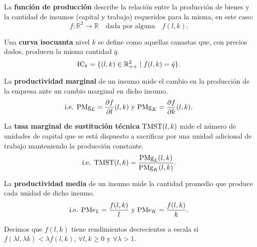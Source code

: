 \documentclass[8pt,a4paper]{extarticle}
\begin{document}
\begin{multicols}{3}
	\begin{boxdef}
		La \textbf{función de producción} describe la relación entre la producción de bienes y la cantidad de insumos (capital y trabajo) requeridos para la misma, en este caso:
		\[
			f: \mathbb{R}^2 \to \mathbb{R} \quad \text{dada por alguna} \quad f(l, k)
			.\]
	\end{boxdef}

	\begin{boxdef}[Isocuanta]
		Una \textbf{curva isocuanta} nivel $k$ se define como aquellas canastas que, con precios dados, producen la misma cantidad $\bar{q}$. \\
		$$\text{\normalfont IC}_k = \{(l, k) \in \mathbb{R}^2_{++} \mid f(l, k) = \bar{q} \}.$$
	\end{boxdef}

	\begin{boxdef}
		La \textbf{productividad marginal} de un insumo mide el cambio en la producción de la empresa ante un cambio marginal en dicho insumo.
		\[
			\text{\normalfont i.e. PMg}_L = \frac{\partial f}{\partial l} (l, k)\ \text{y } \text{\normalfont PMg}_K = \frac{\partial f}{\partial k} (l, k)
			.\]
	\end{boxdef}

	\begin{boxdef}
		La \textbf{tasa marginal de sustitución técnica} $\text{\normalfont TMST} (l, k) $ mide el número de unidades de capital que se está dispuesto a sacrificar por una unidad adicional de trabajo manteniendo la producción constante.
		\[
			\text{\normalfont i.e. TMST}(l,k) = \frac{\text{\normalfont PMg}_L (l, k)}{\text{\normalfont PMg}_K (l, k)}
			.\]
	\end{boxdef}

	\begin{boxdef}
		La \textbf{productividad media} de un insumo mide la cantidad promedio que produce cada unidad de dicho insumo.
		\[
			\text{\normalfont i.e. PMe}_L = \frac{f (l, k)}{l}\ \text{y } \text{\normalfont PMe}_K = \frac{f (l, k)}{k}
			.\]
	\end{boxdef}

	\sectionbreak

	\begin{boxtheo}
		Decimos que $f(l, k)$ tiene rendimientos decrecientes a escala si $f(\lambda l, \lambda k) < \lambda f(l, k)$,\; $\forall l, k \ge 0$ y $\forall \lambda > 1$.
	\end{boxtheo}


\end{multicols}
\end{document}
